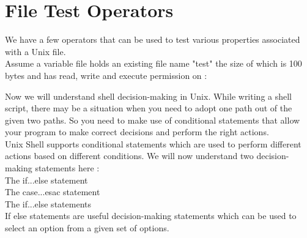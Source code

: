 \documentclass{article}
\begin{document}
\section*{File Test Operators}
We have a few operators that can be used to test various properties associated with a Unix file.\\
Assume a variable file holds an existing file name "test" the size of which is 100 bytes and has read, write and execute permission on :\\
\begin{center}
\end{center}
Now we will understand shell decision-making in Unix. While writing a shell script, there may be a situation when you need to adopt one path out of the given two paths. So you need to make use of conditional statements that allow your program to make correct decisions and perform the right actions.\\
Unix Shell supports conditional statements which are used to perform different actions based on different conditions. We will now understand two decision-making statements here :\\
    The if...else statement\\
    The case...esac statement\\
The if...else statements\\
If else statements are useful decision-making statements which can be used to select an option from a given set of options.\\
\end{document}
